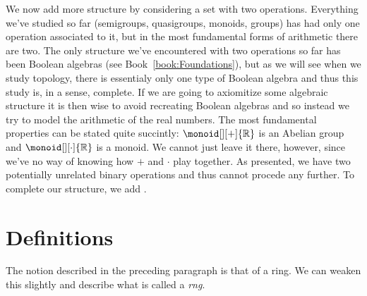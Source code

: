 We now add more structure by considering a set with two operations.
Everything we've studied so far (semigroups, quasigroups, monoids,
groups) has had only one operation associated to it, but in the most
fundamental forms of arithmetic there are two. The only structure we've
encountered with two operations so far has been Boolean algebras
(see Book~\ref{book:Foundations}), but as we will see when we study
topology, there is essentialy only one type of Boolean algebra and thus
this study is, in a sense, complete. If we are going to axiomitize some
algebraic structure it is then wise to avoid recreating Boolean algebras
and so instead we try to model the arithmetic of the real numbers. The
most fundamental properties can be stated quite succintly:
$\monoid[][+]{\mathbb{R}}$ is an Abelian group and
$\monoid[][\cdot]{\mathbb{R}}$ is a monoid. We cannot just leave it
there, however, since we've no way of knowing how $+$ and $\cdot$ play
together. As presented, we have two potentially unrelated binary
operations and thus cannot procede any further. To complete our
structure, we add .
\section{Definitions}
    The notion described in the preceding paragraph is that of a \gls{ring}. We
    can weaken this slightly and describe what is called a \textit{rng}.
